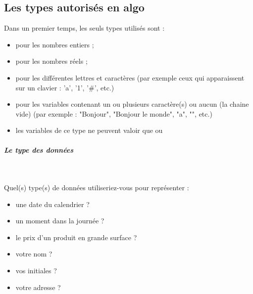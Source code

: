 \documentclass[11pt,a4paper]{article}
\begin{document}
            \par
        \subsection{Les types autoris\'es en algo}
          Dans un premier temps, les seuls types utilis\'es sont :
          
					\begin{itemize}
				
			\item \verb@entier@ pour les nombres entiers ;
			\item {} pour les nombres r\'eels ;
			\item {} pour les diff\'erentes lettres et caract\`eres
              (par exemple ceux qui apparaissent sur un clavier : 'a', '1', '\#', etc.)
			\item \verb@chaine@ pour les variables contenant un ou plusieurs caract\`ere(s) ou aucun (la chaine vide)
              (par exemple : "Bonjour", "Bonjour le monde", "a", "", etc.)
			\item {} les variables de ce type 
            ne peuvent valoir que \verb@vrai@ ou \verb@faux@
					\end{itemize}
				
            \par
        
			
		\subparagraph{Le type des donn\'ees} 
		
                \textcolor{white}{.} \par
             
								Quel(s) type(s) de donn\'ees utiliseriez-vous pour repr\'esenter :
							
					\begin{itemize}
				
			\item une date du calendrier ?  \textcolor{gray}{\underline{\hspace*{10em}}} 
			\item un moment dans la journ\'ee ?  \textcolor{gray}{\underline{\hspace*{10em}}} 
			\item le prix d'un produit en grande surface ? \textcolor{gray}{\underline{\hspace*{5em}}} 
			\item votre nom ?  \textcolor{gray}{\underline{\hspace*{10em}}} 
			\item vos initiales ? \textcolor{gray}{\underline{\hspace*{10em}}} 
			\item votre adresse ?  \textcolor{gray}{\underline{\hspace*{10em}}} 
					\end{itemize}
\end{document}

